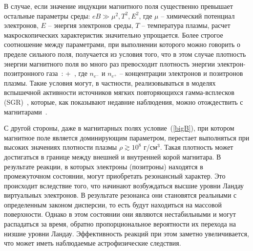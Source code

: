В случае, если значение индукции магнитного поля существенно превышает остальные параметры среды: $eB \gg \mu^2, T^2, E^2$, где $\mu$ -- химический потенциал электронов, $E$ -- энергия электронов среды, $T$ -- температура плазмы, расчет макроскопических характеристик значительно упрощается. Более строгое соотношение между параметрами, при выполнении которого можно говорить о пределе сильного поля, получается из условия того, что в этом случае плотность энергии магнитного поля во много раз превосходит плотность энергии электрон-позитронного газа~\cite{KuzMih:2000}: 
%
\beq
\label{bigB}
 \gg {} + \,,
\eeq 
%
\noindent где $n_{e^{-}}$ и $n_{e^{+}}$ -- концентрации электронов и позитронов плазмы. Такие условия могут, в частности, реализовываться в моделях вспышечной активности источников мягких повторяющихся гамма-всплесков 
(SGR)~\cite{Duncan:1995, Bisnovatyi:1979}, которые, как показывают недавние наблюдения, можно отождествить с магнитарами~\cite{Kouveliotou:1998ze,Kouveliotou:1998fd,Gavriil:2002mc,Ibrahim:2002zw,Ibrahim:2002zy,Olausen:2014}.

С другой стороны, даже в магнитарных полях условие~(\ref{bigB}), при котором магнитное поле является доминирующим параметром, перестает выполняться при высоких значениях плотности плазмы $\rho \gtrsim 10^8$ г/см$^3$. Такая плотность может достигаться в  границе между внешней и внутренней корой магнитара. В результате реакции, в которых электроны (позитроны) находятся в промежуточном состоянии, могут приобретать резонансный характер.
Это происходит вследствие того, что начинают возбуждаться высшие уровни Ландау виртуальных электронов. В результате резонанса они становятся реальными с определенным законом дисперсии, то есть будут находиться на массовой поверхности. 
Однако в этом состоянии они являются нестабильными и могут распадаться за время, обратно пропорциональное вероятности их перехода на низшие уровни Ландау. Эффективность реакций при этом заметно увеличивается, что 
может иметь наблюдаемые астрофизические следствия.

